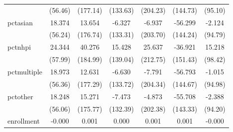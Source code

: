 {\begin{tabular}{l*{6}{c}}
            &                  (56.46)         &                 (177.14)         &                 (133.63)         &                 (204.23)         &                 (144.73)         &                  (95.10)         \\
pctasian    &                   18.374         &                   13.654         &                   -6.327         &                   -6.937         &                  -56.299         &                   -2.124         \\
            &                  (56.24)         &                 (176.74)         &                 (133.31)         &                 (203.70)         &                 (144.24)         &                  (94.79)         \\
pctnhpi     &                   24.344         &                   40.276         &                   15.428         &                   25.637         &                  -36.921         &                   15.218         \\
            &                  (57.99)         &                 (184.99)         &                 (139.04)         &                 (212.75)         &                 (151.43)         &                  (98.42)         \\
pctmultiple &                   18.973         &                   12.631         &                   -6.630         &                   -7.791         &                  -56.793         &                   -1.015         \\
            &                  (56.36)         &                 (177.29)         &                 (133.72)         &                 (204.34)         &                 (144.67)         &                  (94.98)         \\
pctother    &                   18.248         &                   15.271         &                   -7.473         &                   -4.873         &                  -55.708         &                   -2.388         \\
            &                  (56.06)         &                 (175.77)         &                 (132.39)         &                 (202.38)         &                 (143.33)         &                  (94.20)         \\
enrollment  &                   -0.000         &                    0.001         &                    0.000         &                    0.001         &                    0.001         &                   -0.000         \\

\end{tabular}}
